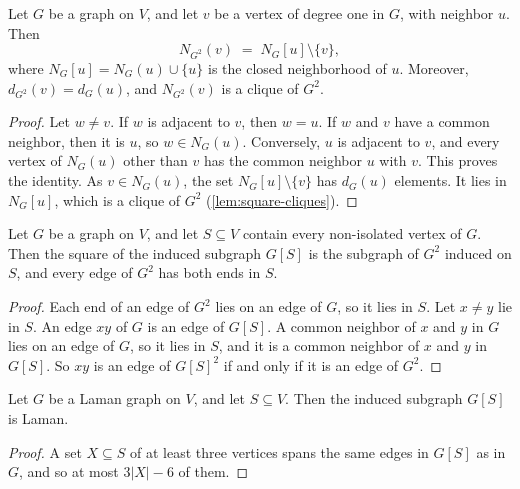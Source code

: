 \begin{lemma}
  \label{lem:square-leaf-neighborhood}
  \leanok
  Let $G$ be a graph on $V$, and let $v$ be a vertex of degree one in
  $G$, with neighbor $u$. Then
  \[
    N_{G^2}(v) \;=\; N_G[u] \setminus \{v\},
  \]
  where $N_G[u] = N_G(u) \cup \{u\}$ is the closed neighborhood of $u$.
  Moreover, $d_{G^2}(v) = d_G(u)$, and $N_{G^2}(v)$ is a clique of
  $G^2$.
\end{lemma}
\begin{proof}
  \leanok
  Let $w \ne v$. If $w$ is adjacent to $v$, then $w = u$. If $w$ and $v$
  have a common neighbor, then it is $u$, so $w \in N_G(u)$. Conversely,
  $u$ is adjacent to $v$, and every vertex of $N_G(u)$ other than $v$
  has the common neighbor $u$ with $v$. This proves the identity. As
  $v \in N_G(u)$, the set $N_G[u] \setminus \{v\}$ has $d_G(u)$
  elements. It lies in $N_G[u]$, which is a clique of $G^2$
  (\cref{lem:square-cliques}).
\end{proof}

\begin{lemma}
  \label{lem:square-induce-support}
  \leanok
  Let $G$ be a graph on $V$, and let $S \subseteq V$ contain every
  non-isolated vertex of $G$. Then the square of the induced subgraph
  $G[S]$ is the subgraph of $G^2$ induced on $S$, and every edge of
  $G^2$ has both ends in $S$.
\end{lemma}
\begin{proof}
  \leanok
  Each end of an edge of $G^2$ lies on an edge of $G$, so it lies in
  $S$. Let $x \ne y$ lie in $S$. An edge $xy$ of $G$ is an edge of
  $G[S]$. A common neighbor of $x$ and $y$ in $G$ lies on an edge of
  $G$, so it lies in $S$, and it is a common neighbor of $x$ and $y$ in
  $G[S]$. So $xy$ is an edge of $G[S]^2$ if and only if it is an edge of
  $G^2$.
\end{proof}

\begin{lemma}
  \label{lem:isLaman3-induce}
  \leanok
  Let $G$ be a Laman graph on $V$, and let $S \subseteq V$. Then the
  induced subgraph $G[S]$ is Laman.
\end{lemma}
\begin{proof}
  \leanok
  A set $X \subseteq S$ of at least three vertices spans the same edges
  in $G[S]$ as in $G$, and so at most $3|X| - 6$ of them.
\end{proof}

